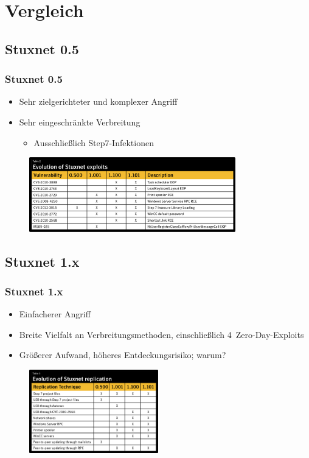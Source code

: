 \documentclass{beamer}
\begin{document}
\section{Vergleich}

\subsection{Stuxnet 0.5}

\begin{frame}
  \frametitle{Stuxnet 0.5}
  \begin{itemize}
    \item Sehr zielgerichteter und komplexer Angriff
    \item Sehr eingeschränkte Verbreitung
      \begin{itemize}
        \item Ausschließlich Step7-Infektionen
      \end{itemize}
  \end{itemize}
  \begin{figure}[p]
    \centering
    \includegraphics[width=0.8\textwidth]{../Evolution_exploits.png}
  \end{figure}
\end{frame}

\subsection{Stuxnet 1.x}

\begin{frame}
  \frametitle{Stuxnet 1.x}
  \begin{itemize}
    \item Einfacherer Angriff
    \item Breite Vielfalt an Verbreitungsmethoden, einschließlich 4~Zero-Day-Exploits
    \item Größerer Aufwand, höheres Entdeckungsrisiko; warum?
  \end{itemize}
  \begin{figure}[p]
    \centering
    \includegraphics[width=0.5\textwidth]{../Evolution_replication.png}
  \end{figure}
\end{frame}
\end{document}
